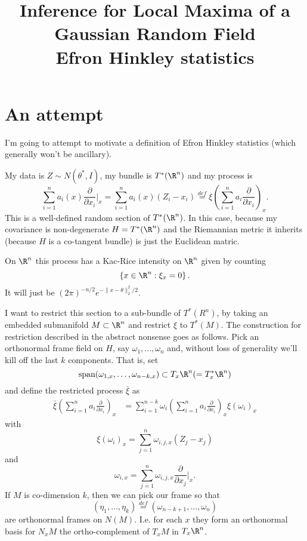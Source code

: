 \documentclass{article}
\title{ {\bf Inference for Local Maxima of a Gaussian Random Field} \\ Efron Hinkley statistics}
\begin{document}
	\maketitle
	\RaggedRight

\section{An attempt}

I'm going to attempt to motivate a definition of Efron Hinkley statistics (which generally
won't be ancillary).

My data is $Z \sim N(\theta^*, I)$, my bundle is $T^*(\R^n)$ and my process is
$$
\sum_{i=1}^n a_i(x) \frac{\partial}{\partial x_i} \biggl|_x = \sum_{i=1}^n a_i(x)(Z_i - x_i) \overset{def}{=} \xi \left(\sum_{i=1}^n a_i \frac{\partial}{\partial x_i}\right)_x.
$$
This is a well-defined random section of $T^*(\R^n)$. In this case, because my covariance
is non-degenerate $H=T^*(\R^n)$ and the Riemannian metric it inherits (because $H$ is
a co-tangent bundle) is just the Euclidean matric.

On $\R^n$ this process has a Kac-Rice intensity on $\R^n$ given by counting
$$
\left\{x \in \R^n: \xi_x=0\right\}.
$$
It will just be $(2\pi)^{-n/2} e^{-\|x-\theta\|^2_2/2}$.

I want to restrict this section
to a sub-bundle of $T^*(R^n)$, by taking an embedded submanifold  $M \subset \R^n$ and restrict $\xi$ to $T^*(M)$. The construction for restriction described in the abstract nonsense goes as follows.
Pick an orthonormal frame field on $H$, say $\omega_1, \dots, \omega_n$ and, without
loss of generality we'll kill off the last $k$ components. That is, set
$$
\text{span}(\omega_{1,x}, \dots, \omega_{n-k,x}) \subset T_x\R^n (=T_x^*\R^n)
$$
and define the restricted process $\bar{\xi}$ as
$$
\begin{aligned}
\bar{\xi}\left(\sum_{i=1}^n a_i \frac{\partial}{\partial x_i}\right)_x &=
\sum_{i=1}^{n-k} \omega_i \left(\sum_{i=1}^n a_i \frac{\partial}{\partial x_i}\right)_x 
\xi(\omega_i)_x
\end{aligned}
$$
with
$$
\xi(\omega_i)_x = \sum_{j=1}^n \omega_{i,j,x} (Z_j-x_j)
$$
and
$$
\omega_{i,x} = \sum_{j=1}^n \omega_{i,j,x} \frac{\partial}{\partial x_j} \biggl|_x.
$$
If $M$ is co-dimension $k$, then we can pick our frame so that
$$(\eta_1, \dots, \eta_k) \overset{def}{=} (\omega_{n-k+1}, \dots, \omega_n)$$
are orthonormal frames on $N(M)$. I.e. for each $x$ they form an orthonormal basis for
$N_xM$ the ortho-complement of $T_xM$ in $T_x\R^n$.
\end{document}

